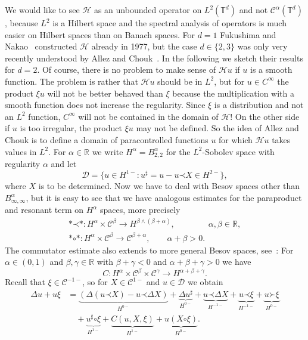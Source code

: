 \documentclass[a4paper, 11pt]{article}
\newcommand{\para}{\mathord{\prec}}
\newcommand{\lpara}{\mathord{\succ}}
\newcommand{\reso}{\mathord{\circ}}
\begin{document}
We would like to see $\mathcal{H}$ as an unbounded operator on $L^2
(\mathbb{T}^d)$ and not $\mathcal{C}^{\alpha} (\mathbb{T}^d)$, because $L^2$
is a Hilbert space and the spectral analysis of operators is
much easier on Hilbert spaces than on Banach spaces. For $d = 1$ Fukushima and Nakao~\cite{fukushima_spectra_1977} constructed
$\mathcal{H}$ already in 1977, but the case $d \in\{2,3\}$
was only very recently understood by Allez and Chouk~\cite{allez_continuous_2015}. In
the following we sketch their results for $d = 2$. Of course, there is no
problem to make sense of $\mathcal{H}u$ if $u$ is a smooth function. The
problem is rather that $\mathcal{H}u$ should be in $L^2$, but for $u \in
C^{\infty}$ the product $\xi u$ will not be better behaved than $\xi$ because the
multiplication with a smooth function does not increase the regularity. Since
$\xi$ is a distribution and not an $L^2$ function, $C^{\infty}$ will not be
contained in the domain of $\mathcal{H}$! On the other side if $u$ is too
irregular, the product $\xi u$ may not be defined. So the idea of Allez and
Chouk is to define a domain of paracontrolled functions $u$ for which
$\mathcal{H}u$ takes values in $L^2$. For $\alpha \in \mathbb{R}$ we write
$H^{\alpha} = B^{\alpha}_{2, 2}$ for the $L^2$-Sobolev space with regularity
$\alpha$ and let
\[ \mathcal{D}= \{ u \in H^{1 -} : u^{\sharp} = u - u \para X \in H^{2 -} \},
\]
where $X$ is to be determined. Now we have to deal with Besov spaces other
than $B^{\alpha}_{\infty, \infty}$, but it is easy to see that we have
analogous estimates for the paraproduct and resonant term on $H^{\alpha}$
spaces, more precisely
\begin{gather*}
  \ast \para \ast : H^{\alpha} \times \mathcal{C}^{\beta} \rightarrow H^{\beta
  \wedge (\beta + \alpha)}, \qquad \qquad \alpha, \beta \in \mathbb{R},\\
  \ast \reso \ast : H^{\alpha} \times \mathcal{C}^{\beta} \rightarrow
  \mathcal{C}^{\beta + \alpha}, \qquad \alpha + \beta > 0.
\end{gather*}
The commutator estimate also extends to more general Besov spaces, see~\cite{promel_rough_2016}: For $\alpha \in (0, 1)$ and $\beta, \gamma
\in \mathbb{R}$ with $\beta + \gamma < 0$ and $\alpha + \beta + \gamma > 0$
we have
\[ C\colon H^{\alpha} \times \mathcal{C}^{\beta} \times \mathcal{C}^{\gamma}
   \rightarrow H^{\alpha + \beta + \gamma} . \]
Recall that $\xi \in \mathcal{C}^{- 1 -}$, so for $X \in \mathcal{C}^{1 -}$
and $u \in \mathcal{D}$ we obtain
\begin{align}\label{eq:Anderson-expansion} \nonumber
   \Delta u + u \xi & = \underbrace{(\Delta (u
  \para X) - u \para \Delta X)}_{H^{0 -}} + \underbrace{\Delta
  u^{\sharp}}_{H^{0 -}} + \underbrace{u \para \Delta X}_{H^{- 1 -}} +
  \underbrace{u \para \xi}_{H^{- 1 -}} + \underbrace{u \lpara \xi}_{H^{0 -}} \\
  &\quad + \underbrace{u^{\sharp} \reso \xi}_{H^{1 -}} + \underbrace{C (u, X,
  \xi)}_{H^{1 -}} + \underbrace{u (X \reso \xi)}_{H^{0 -}} .
\end{align}
\end{document}

